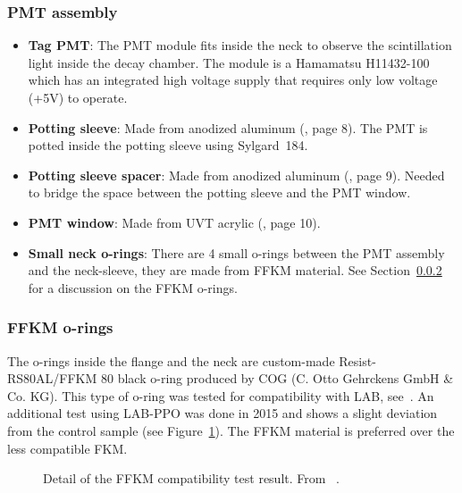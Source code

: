 \subsubsection{PMT assembly}
\begin{itemize}
    \item {\bf Tag PMT}: The PMT module fits inside the neck to observe the scintillation light inside the decay chamber. The module is a Hamamatsu H11432-100 which has an integrated high voltage supply that requires only low voltage (+5V) to operate.
    \item {\bf Potting sleeve}: Made from anodized aluminum (\cite{wallig:2015}, page 8). The PMT is potted inside the potting sleeve using Sylgard~184. 
    \item {\bf Potting sleeve spacer}: Made from anodized aluminum (\cite{wallig:2015}, page 9). Needed to bridge the space between the potting sleeve and the PMT window.
    \item {\bf PMT window}: Made from UVT acrylic (\cite{wallig:2015}, page 10).
    \item {\bf Small neck o-rings}: There are 4 small o-rings between the PMT assembly and the neck-sleeve, they are made from FFKM material. See Section~\ref{sec:oring} for a discussion on the FFKM o-rings.
\end{itemize}
\subsubsection{FFKM o-rings}
\label{sec:oring}
The o-rings inside the flange and the neck are custom-made Resist-RS80AL/FFKM 80 black o-ring produced by COG (C. Otto Gehrckens GmbH \& Co. KG). This type of o-ring was tested for compatibility with LAB, see~\cite{snoplus:2013}. An additional test using LAB-PPO was done in 2015 and shows a slight deviation from the control sample (see Figure~\ref{fig:FFKM}). The FFKM material is preferred over the less compatible FKM.
\begin{figure}
\caption{\label{fig:FFKM}Detail of the FFKM compatibility test result. From ~\cite{snoplus:2013}.}
\end{figure}
